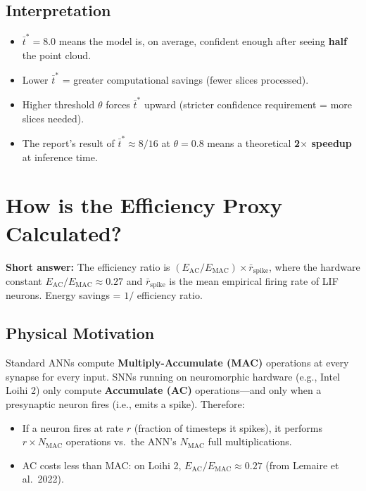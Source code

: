 \documentclass[11pt,a4paper]{article}
\begin{document}
\subsection{Interpretation}

\begin{itemize}
  \item $\bar{t}^* = 8.0$ means the model is, on average, confident enough
        after seeing \textbf{half} the point cloud.
  \item Lower $\bar{t}^*$ = greater computational savings (fewer slices processed).
  \item Higher threshold $\theta$ forces $\bar{t}^*$ upward (stricter confidence
        requirement = more slices needed).
  \item The report's result of $\bar{t}^* \approx 8/16$ at $\theta = 0.8$ means
        a theoretical \textbf{2$\times$ speedup} at inference time.
\end{itemize}

\section{How is the Efficiency Proxy Calculated?}

\begin{answerbox}
\textbf{Short answer:} The efficiency ratio is $(E_{\text{AC}} / E_{\text{MAC}})
\times \bar{r}_{\text{spike}}$, where the hardware constant $E_{\text{AC}}/
E_{\text{MAC}} \approx 0.27$ and $\bar{r}_{\text{spike}}$ is the mean empirical
firing rate of LIF neurons. Energy savings = $1 /$ efficiency ratio.
\end{answerbox}

\subsection{Physical Motivation}

Standard ANNs compute \textbf{Multiply-Accumulate (MAC)} operations at every
synapse for every input. SNNs running on neuromorphic hardware (e.g., Intel
Loihi 2) only compute \textbf{Accumulate (AC)} operations---and only when a
presynaptic neuron fires (i.e., emits a spike). Therefore:

\begin{itemize}
  \item If a neuron fires at rate $r$ (fraction of timesteps it spikes), it
        performs $r \times N_{\text{MAC}}$ operations vs.\ the ANN's
        $N_{\text{MAC}}$ full multiplications.
  \item AC costs less than MAC: on Loihi 2, $E_{\text{AC}} / E_{\text{MAC}}
        \approx 0.27$ (from Lemaire et al.\ 2022).
\end{itemize}
\end{document}
